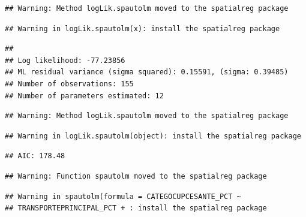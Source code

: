 \documentclass[11pt,]{article}
\newenvironment{Shaded}{\begin{snugshade}}{\end{snugshade}}
\newcommand{\KeywordTok}[1]{\textcolor[rgb]{0.13,0.29,0.53}{\textbf{#1}}}
\newcommand{\DataTypeTok}[1]{\textcolor[rgb]{0.13,0.29,0.53}{#1}}
\newcommand{\StringTok}[1]{\textcolor[rgb]{0.31,0.60,0.02}{#1}}
\newcommand{\OperatorTok}[1]{\textcolor[rgb]{0.81,0.36,0.00}{\textbf{#1}}}
\newcommand{\NormalTok}[1]{#1}
\begin{document}
\begin{verbatim}
## Warning: Method logLik.spautolm moved to the spatialreg package
\end{verbatim}

\begin{verbatim}
## Warning in logLik.spautolm(x): install the spatialreg package
\end{verbatim}

\begin{verbatim}
## 
## Log likelihood: -77.23856 
## ML residual variance (sigma squared): 0.15591, (sigma: 0.39485)
## Number of observations: 155 
## Number of parameters estimated: 12
\end{verbatim}

\begin{verbatim}
## Warning: Method logLik.spautolm moved to the spatialreg package
\end{verbatim}

\begin{verbatim}
## Warning in logLik.spautolm(object): install the spatialreg package
\end{verbatim}

\begin{verbatim}
## AIC: 178.48
\end{verbatim}

\begin{Shaded}
\end{Shaded}

\begin{verbatim}
## Warning: Function spautolm moved to the spatialreg package
\end{verbatim}

\begin{verbatim}
## Warning in spautolm(formula = CATEGOCUPCESANTE_PCT ~
## TRANSPORTEPRINCIPAL_PCT + : install the spatialreg package
\end{verbatim}
\end{document}
